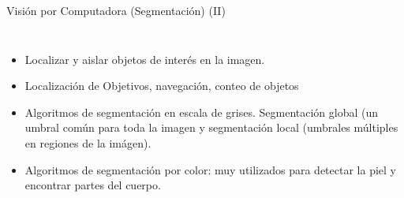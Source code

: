 \begin{frame}{Visión por Computadora (Segmentación) (II)}
\begin{columns}
  \begin{itemize}
    \item Localizar y aislar objetos de interés en la imagen.
    \item Localización de Objetivos, navegación, conteo de objetos
    \item Algoritmos de segmentación en escala de grises. Segmentación global (un umbral común para toda la imagen y segmentación local (umbrales múltiples en regiones de la imágen).
    \item Algoritmos de segmentación por color: muy utilizados para detectar la piel y encontrar partes del cuerpo.
  \end{itemize}
  

\end{columns}
\end{frame}
